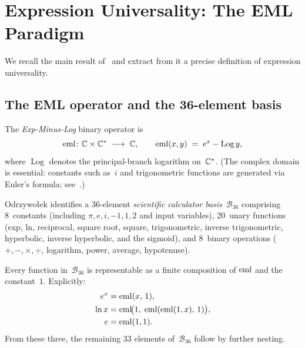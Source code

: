 \section{Expression Universality: The EML Paradigm}\label{sec:L0}

We recall the main result of~\cite{Odrzywołek2026} and
extract from it a precise definition of expression universality.

\subsection{The EML operator and the 36-element basis}

\begin{definition}\label{def:eml}
The \emph{Exp-Minus-Log} binary operator is
\[
  \operatorname{eml} \colon \mathbb{C} \times \mathbb{C}^{*} \;\longrightarrow\; \mathbb{C},
  \qquad
  \operatorname{eml}(x,y) \;=\; e^{x} - \operatorname{Log} y,
\]
where $\operatorname{Log}$ denotes the principal-branch
logarithm on~$\mathbb{C}^{*}$.
(The complex domain is essential: constants such as~$i$
and trigonometric functions are generated via Euler's
formula; see~\cite{Odrzywołek2026}.)
\end{definition}

Odrzywołek identifies a 36-element \emph{scientific calculator
basis}~$\mathcal{B}_{36}$ comprising 8~constants (including
$\pi,e,i,-1,1,2$ and input variables), 20~unary functions
(exp, ln, reciprocal, square root, square, trigonometric,
inverse trigonometric, hyperbolic, inverse hyperbolic, and the
sigmoid), and 8~binary operations ($+,-,\times,\div$, logarithm,
power, average, hypotenuse).

\begin{theorem}
\label{thm:eml-universality}
Every function in~$\mathcal{B}_{36}$ is representable as a finite
composition of\/ $\operatorname{eml}$ and the constant~$1$.  Explicitly:
\begin{align}
  e^{x}  &= \operatorname{eml}(x,\, 1), \label{eq:eml-exp}\\
  \ln x  &= \operatorname{eml}\!\bigl(1,\;
            \operatorname{eml}(\operatorname{eml}(1,x),\,1)\bigr), \label{eq:eml-ln}\\
  e      &= \operatorname{eml}(1,1). \label{eq:eml-e}
\end{align}
From these three, the remaining 33 elements of~$\mathcal{B}_{36}$
follow by further nesting.
\end{theorem}

